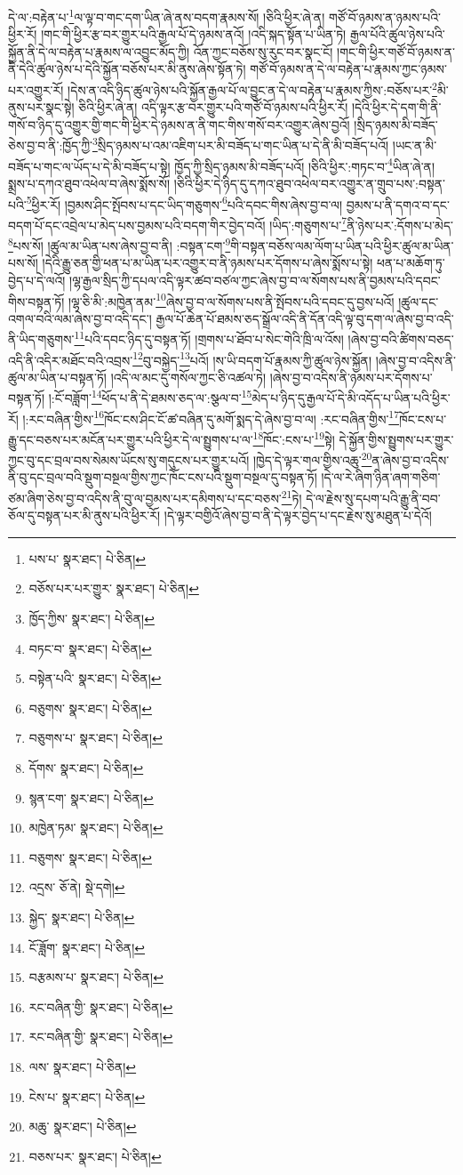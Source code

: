 དེ་ལ་:བརྟེན་པ་\footnote{པས་པ་  སྣར་ཐང་།  པེ་ཅིན། }ལ་ལྟ་བ་གང་དག་ཡིན་ཞེ་ནས་བདག་རྣམས་སོ། །ཅིའི་ཕྱིར་ཞེ་ན། གཙོ་བོ་ཉམས་ན་ཉམས་པའི་ཕྱིར་རོ། །གང་གི་ཕྱིར་རྩ་བར་གྱུར་པའི་རྒྱལ་པོ་དེ་ཉམས་ནའོ། །འདི་སྐད་སྟོན་པ་ཡིན་ཏེ། རྒྱལ་པོའི་ཚུལ་ཉེས་པའི་སྐྱོན་ནི་དེ་ལ་བརྟེན་པ་རྣམས་ལ་འབྱུང་མོད་ཀྱི། འོན་ཀྱང་བཅོས་སུ་རུང་བར་སྣང་ངོ། །གང་གི་ཕྱིར་གཙོ་བོ་ཉམས་ན་ནི་དེའི་ཚུལ་ཉེས་པ་དེའི་སྐྱོན་བཅོས་པར་མི་ནུས་ཞེས་སྟོན་ཏེ། གཙོ་བོ་ཉམས་ན་དེ་ལ་བརྟེན་པ་རྣམས་ཀྱང་ཉམས་པར་འགྱུར་རོ། །དེས་ན་འདི་ཉིད་ཚུལ་ཉེས་པའི་སྐྱོན་རྒྱལ་པོ་ལ་བྱུང་ན་དེ་ལ་བརྟེན་པ་རྣམས་ཀྱིས་:བཅོས་པར་\footnote{བཅོས་པར་པར་གྱུར་  སྣར་ཐང་།  པེ་ཅིན། }མི་ནུས་པར་སྣང་སྟེ། ཅིའི་ཕྱིར་ཞེ་ན། འདི་ལྟར་རྩ་བར་གྱུར་པའི་གཙོ་བོ་ཉམས་པའི་ཕྱིར་རོ། །དེའི་ཕྱིར་དེ་དག་གི་ནི་གསོ་བ་ཉིད་དུ་འགྱུར་གྱི་གང་གི་ཕྱིར་དེ་ཉམས་ན་ནི་གང་གིས་གསོ་བར་འགྱུར་ཞེས་བྱའོ། །སྲིད་ཉམས་མི་བཟོད་ཅེས་བྱ་བ་ནི་:ཁྱོད་ཀྱི་\footnote{ཁྱོད་ཀྱིས་  སྣར་ཐང་།  པེ་ཅིན། }སྲིད་ཉམས་པ་འམ་འཇིག་པར་མི་བཟོད་པ་གང་ཡིན་པ་དེ་ནི་མི་བཟོད་པའོ། །ཡང་ན་མི་བཟོད་པ་གང་ལ་ཡོད་པ་དེ་མི་བཟོད་པ་སྟེ། ཁྱོད་ཀྱི་སྲིད་ཉམས་མི་བཟོད་པའོ། །ཅིའི་ཕྱིར་:གཏང་བ་\footnote{བཏང་བ་  སྣར་ཐང་།  པེ་ཅིན། }ཡིན་ཞེ་ན། སྨྲས་པ་དཀའ་ཐུབ་འཕེལ་བ་ཞེས་སྨོས་སོ། །ཅིའི་ཕྱིར་དེ་ཉིད་དུ་དཀའ་ཐུབ་འཕེལ་བར་འགྱུར་ན་གྲུབ་པས་:བསྟན་པའི་\footnote{བསྟེན་པའི་  སྣར་ཐང་།  པེ་ཅིན། }ཕྱིར་རོ། །བྱམས་ཤིང་སྤོབས་པ་དང་ཡིད་གཅུགས་\footnote{བཅུགས་  སྣར་ཐང་།  པེ་ཅིན། }པའི་དབང་གིས་ཞེས་བྱ་བ་ལ། བྱམས་པ་ནི་དགའ་བ་དང་བདག་པོ་དང་འབྲེལ་པ་མེད་པས་བྱམས་པའི་བདག་གིར་བྱེད་བའོ། །ཡིད་:གཅུགས་པ་\footnote{བཅུགས་པ་  སྣར་ཐང་།  པེ་ཅིན། }ནི་ཉེས་པར་:དོགས་པ་མེད་\footnote{དོགས་  སྣར་ཐང་།  པེ་ཅིན། }པས་སོ། །ཚུལ་མ་ཡིན་པས་ཞེས་བྱ་བ་ནི། :བསྟན་ངག་\footnote{སྙན་ངག་  སྣར་ཐང་།  པེ་ཅིན། }གི་བསྟན་བཅོས་ལམ་ལོག་པ་ཡིན་པའི་ཕྱིར་ཚུལ་མ་ཡིན་པས་སོ། །དེའི་རྒྱུ་ཅན་གྱི་ཕན་པ་མ་ཡིན་པར་འགྱུར་བ་ནི་ཉམས་པར་དོགས་པ་ཞེས་སྨོས་པ་སྟེ། ཕན་པ་མཆོག་ཏུ་བྱེད་པ་དེ་ལའོ། །ལྷ་རྒྱལ་སྲིད་ཀྱི་དཔལ་འདི་ལྟར་ཚབ་བཙལ་ཀྱང་ཞེས་བྱ་བ་ལ་སོགས་པས་ནི་བྱམས་པའི་དབང་གིས་བསྟན་ཏོ། །ལྷ་ཅི་མི་:མཁྱེན་ནམ་\footnote{མཁྱེན་ཏམ་  སྣར་ཐང་།  པེ་ཅིན། }ཞེས་བྱ་བ་ལ་སོགས་པས་ནི་སྤོབས་པའི་དབང་དུ་བྱས་པའོ། །ཚུལ་དང་འགལ་བའི་ལམ་ཞེས་བྱ་བ་འདི་དང་། རྒྱལ་པོ་ཆེན་པོ་ཐམས་ཅད་སྒྲོལ་འདི་ནི་དོན་འདི་ལྟ་བུ་དག་ལ་ཞེས་བྱ་བ་འདི་ནི་ཡིད་གཅུགས་\footnote{བཅུགས་  སྣར་ཐང་།  པེ་ཅིན། }པའི་དབང་ཉིད་དུ་བསྟན་ཏོ། །གྲགས་པ་ཐོབ་པ་སེང་གེའི་ཁྲི་ལ་འོས། །ཞེས་བྱ་བའི་ཚིགས་བཅད་འདི་ནི་འདིར་མཐོང་བའི་འབྲས་\footnote{འདྲས་  ཅོ་ནེ།  སྡེ་དགེ། }བུ་བསྐྱེད་\footnote{སྐྱེད་  སྣར་ཐང་།  པེ་ཅིན། }པའོ། །ས་ཡི་བདག་པོ་རྣམས་ཀྱི་ཚུལ་ཉེས་སྐྱོན། །ཞེས་བྱ་བ་འདིས་ནི་ཚུལ་མ་ཡིན་པ་བསྟན་ཏོ། །འདི་ལ་མང་དུ་གསོལ་ཀྱང་ཅི་འཚལ་ཏེ། །ཞེས་བྱ་བ་འདིས་ནི་ཉམས་པར་དོགས་པ་བསྟན་ཏོ། །:ངོ་བཟློག་\footnote{ངོ་ཟློག་  སྣར་ཐང་།  པེ་ཅིན། }ཕོད་པ་ནི་དེ་ཐམས་ཅད་ལ་:སྩལ་བ་\footnote{བརྩམས་པ་  སྣར་ཐང་།  པེ་ཅིན། }མེད་པ་ཉིད་དུ་རྒྱལ་པོ་དེ་མི་འདོད་པ་ཡིན་པའི་ཕྱིར་རོ། །:རང་བཞིན་གྱིས་\footnote{རང་བཞིན་གྱི་  སྣར་ཐང་།  པེ་ཅིན། }ཁོང་ངས་ཤིང་ངོ་ཚ་བཞིན་དུ་མགོ་སྨད་དེ་ཞེས་བྱ་བ་ལ། :རང་བཞིན་གྱིས་\footnote{རང་བཞིན་གྱི་  སྣར་ཐང་།  པེ་ཅིན། }ཁོང་ངས་པ་རྒྱུ་དང་བཅས་པར་མངོན་པར་གྱུར་པའི་ཕྱིར་དེ་ལ་སྤྱུགས་པ་ལ་\footnote{ལས་  སྣར་ཐང་།  པེ་ཅིན། }ཁོང་:ངས་པ་\footnote{ངེས་པ་  སྣར་ཐང་།  པེ་ཅིན། }སྟེ། དེ་སྐྱོན་གྱིས་སྤྱུགས་པར་གྱུར་ཀྱང་བུ་དང་བྲལ་བས་སེམས་ཡོངས་སུ་གདུངས་པར་གྱུར་པའོ། །ཁྱེད་དེ་ལྟར་གལ་གྱིས་འཆུ་\footnote{མཆུ་  སྣར་ཐང་།  པེ་ཅིན། }ན་ཞེས་བྱ་བ་འདིས་ནི་བུ་དང་བྲལ་བའི་སྡུག་བསྔལ་གྱིས་ཀྱང་ཁོང་ངས་པའི་སྡུག་བསྔལ་དུ་བསྟན་ཏོ། །དེ་ལ་རེ་ཞིག་ཉིན་ཞག་གཅིག་ཙམ་ཞིག་ཅེས་བྱ་བ་འདིས་ནི་བུ་ལ་བྱམས་པར་དམིགས་པ་དང་བཅས་\footnote{བཅས་པར་  སྣར་ཐང་།  པེ་ཅིན། }ཏེ། དེ་ལ་རྗེས་སུ་དཔག་པའི་རྒྱུ་ནི་བབ་ཅོལ་དུ་བསྟན་པར་མི་ནུས་པའི་ཕྱིར་རོ། །དེ་ལྟར་བགྱིའོ་ཞེས་བྱ་བ་ནི་དེ་ལྟར་བྱེད་པ་དང་རྗེས་སུ་མཐུན་པ་དེའོ། 